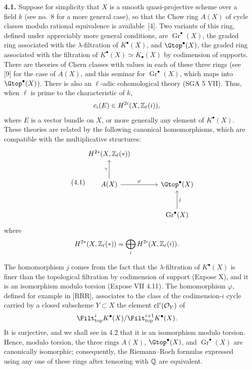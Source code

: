 \noindent\textbf{4.1.}
Suppose for simplicity that $X$ is a smooth quasi-projective scheme over a
field $k$ (see no.~8 for a more general case), so that the Chow ring $A(X)$
of cycle classes modulo rational equivalence is available~[4]. Two variants
of this ring, defined under appreciably more general conditions, are
$\operatorname{Gr}^\bullet(X)$, the graded ring associated with the
$\lambda$-filtration of $K^\bullet(X)$, and $\Gtop^\bullet(X)$, the graded
ring associated with the filtration of
$K^\bullet(X)\simeq K_\bullet(X)$ by codimension of supports. There are
theories of Chern classes with values in each of these three rings (see [9]
for the case of $A(X)$, and this seminar for
$\operatorname{Gr}^\bullet(X)$, which maps into $\Gtop^\bullet(X)$). There is
also an $\ell$-adic cohomological theory (SGA 5 VII). Thus, when $\ell$ is
prime to the characteristic of $k$,
\[
 c_i(E)\in H^{2i}(X,\mathbb Z_\ell(i)),
\]
where $E$ is a vector bundle on $X$, or more generally any element of
$K^\bullet(X)$. These theories are related by the following canonical
homomorphisms, which are compatible with the multiplicative structures:
\begin{equation*}\tag{4.1}
\begin{tikzcd}[column sep=large,row sep=large]
 H^{2*}(X,\Zell(*)) & {} \\
 A(X) \arrow[u,"\gamma"] \arrow[r,"\varphi"] & \Gtop^\bullet(X) \\
 {} & \operatorname{Gr}^\bullet(X) \arrow[u,"j"']
\end{tikzcd}
\end{equation*}
where
\[
 H^{2*}(X,\mathbb Z_\ell(*))=\bigoplus_i H^{2i}(X,\mathbb Z_\ell(i)).
\]

The homomorphism $j$ comes from the fact that the $\lambda$-filtration of
$K^\bullet(X)$ is finer than the topological filtration by codimension of
support (Expose X), and it is an isomorphism modulo torsion (Expose VII
4.11). The homomorphism $\varphi$, defined for example in [RRR], associates
to the class of the codimension-$i$ cycle carried by a closed subscheme
$Y\subset X$ the element $\operatorname{cl}^i(\mathcal O_Y)$ of
\[
 \Filt_{\mathrm{top}}^i K^\bullet(X)/
 \Filt_{\mathrm{top}}^{i+1}K^\bullet(X).
\]
It is surjective, and we shall see in 4.2 that it is an isomorphism modulo
torsion. Hence, modulo torsion, the three rings $A(X)$,
$\Gtop^\bullet(X)$, and $\operatorname{Gr}^\bullet(X)$ are canonically
isomorphic; consequently, the Riemann--Roch formulas expressed using any
one of these rings after tensoring with $\mathbb Q$ are equivalent.

